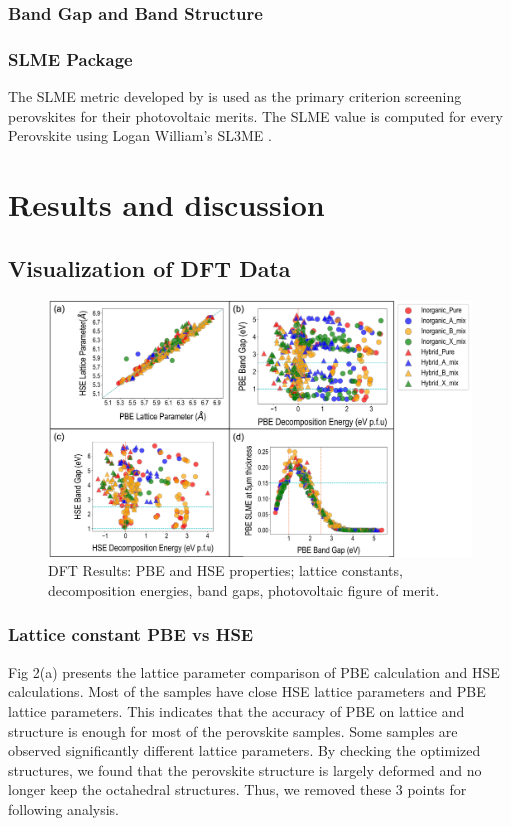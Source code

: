 \documentclass[twoside, twocolumn, 9pt, draft]{article}
\begin{document}
\subsubsection*{Band Gap and Band Structure}
\label{sec:orgf088d92}
\subsubsection*{SLME Package}
\label{sec:org77d741c}
The SLME metric developed by \citet{yu-2012-ident-poten} is used as the
primary criterion screening perovskites for their photovoltaic
merits. The SLME value is computed for every Perovskite using Logan
William's SL3ME \cite{williams-2022-sl3me}.
\section*{Results and discussion}
\label{sec:org224a9b5}
\subsection*{Visualization of DFT Data}
\label{sec:orgd94adcd}
\begin{figure}
\centering
\includegraphics[width=.9\linewidth]{Figure2.png}
\caption{\label{Fig:pairplots} DFT Results: PBE and HSE properties; lattice constants, decomposition energies, band gaps, photovoltaic figure of merit.}
\end{figure}

\subsubsection*{Lattice constant PBE vs HSE}
\label{sec:org7590674}
Fig 2(a) presents the lattice parameter comparison of PBE calculation
and HSE calculations. Most of the samples have close HSE lattice
parameters and PBE lattice parameters. This indicates that the accuracy
of PBE on lattice and structure is enough for most of the perovskite
samples. Some samples are observed significantly different lattice
parameters. By checking the optimized structures, we found that the
perovskite structure is largely deformed and no longer keep the
octahedral structures. Thus, we removed these 3 points for following
analysis.
\end{document}
